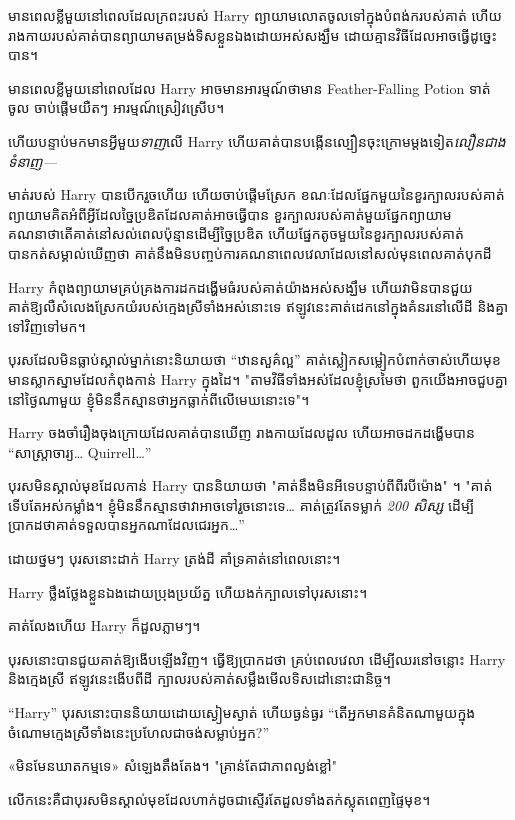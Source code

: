 មានពេលខ្លីមួយនៅពេលដែលក្រពះរបស់ Harry ព្យាយាមលោតចូលទៅក្នុងបំពង់ករបស់គាត់ ហើយរាងកាយរបស់គាត់បានព្យាយាមតម្រង់ទិសខ្លួនឯងដោយអស់សង្ឃឹម ដោយគ្មានវិធីដែលអាចធ្វើដូច្នេះបាន។

មានពេលខ្លីមួយនៅពេលដែល Harry អាចមានអារម្មណ៍ថាមាន Feather-Falling Potion ទាត់ចូល ចាប់ផ្តើមយឺតៗ អារម្មណ៍ស្រៀវស្រើប។

ហើយបន្ទាប់មកមានអ្វីមួយ\emph{ទាញ}លើ Harry ហើយគាត់បានបង្កើនល្បឿនចុះក្រោមម្តងទៀត\emph{លឿនជាងទំនាញ—}

មាត់របស់ Harry បានបើករួចហើយ ហើយចាប់ផ្តើមស្រែក ខណៈដែលផ្នែកមួយនៃខួរក្បាលរបស់គាត់ព្យាយាមគិតអំពីអ្វីដែលច្នៃប្រឌិតដែលគាត់អាចធ្វើបាន ខួរក្បាលរបស់គាត់មួយផ្នែកព្យាយាមគណនាថាតើគាត់នៅសល់ពេលប៉ុន្មានដើម្បីច្នៃប្រឌិត ហើយផ្នែកតូចមួយនៃខួរក្បាលរបស់គាត់បានកត់សម្គាល់ឃើញថា គាត់នឹងមិនបញ្ចប់ការគណនាពេលវេលាដែលនៅសល់មុនពេលគាត់បុកដី

\later

Harry កំពុងព្យាយាមគ្រប់គ្រងការដកដង្ហើមធំរបស់គាត់យ៉ាងអស់សង្ឃឹម ហើយវាមិនបានជួយគាត់ឱ្យលឺសំលេងស្រែកយំរបស់ក្មេងស្រីទាំងអស់នោះទេ ឥឡូវនេះគាត់ដេកនៅក្នុងគំនរនៅលើដី និងគ្នាទៅវិញទៅមក។

បុរស​ដែល​មិន​ធ្លាប់​ស្គាល់​ម្នាក់​នោះ​និយាយ​ថា “ឋានសួគ៌​ល្អ” គាត់​ស្លៀក​សម្លៀក​បំពាក់​ចាស់​ហើយ​មុខ​មាន​ស្លាកស្នាម​ដែល​កំពុង​កាន់ Harry ក្នុង​ដៃ។ "តាមវិធីទាំងអស់ដែលខ្ញុំស្រមៃថា ពួកយើងអាចជួបគ្នានៅថ្ងៃណាមួយ ខ្ញុំមិននឹកស្មានថាអ្នកធ្លាក់ពីលើមេឃនោះទេ"។

Harry ចងចាំរឿងចុងក្រោយដែលគាត់បានឃើញ រាងកាយដែលដួល ហើយអាចដកដង្ហើមបាន “សាស្រ្តាចារ្យ… Quirrell…”

បុរសមិនស្គាល់មុខដែលកាន់ Harry បាននិយាយថា "គាត់នឹងមិនអីទេបន្ទាប់ពីពីរបីម៉ោង" ។ "គាត់ទើបតែអស់កម្លាំង។ ខ្ញុំមិននឹកស្មានថាវាអាចទៅរួចនោះទេ… គាត់ត្រូវតែទម្លាក់ \emph{200 សិស្ស} ដើម្បីប្រាកដថាគាត់ទទួលបានអ្នកណាដែលជេរអ្នក…”

ដោយថ្នមៗ បុរសនោះដាក់ Harry ត្រង់ដី គាំទ្រគាត់នៅពេលនោះ។

Harry ថ្លឹងថ្លែងខ្លួនឯងដោយប្រុងប្រយ័ត្ន ហើយងក់ក្បាលទៅបុរសនោះ។

គាត់​លែង​ហើយ Harry ក៏​ដួល​ភ្លាម​ៗ។

បុរសនោះបានជួយគាត់ឱ្យងើបឡើងវិញ។ ធ្វើឱ្យប្រាកដថា គ្រប់ពេលវេលា ដើម្បីឈរនៅចន្លោះ Harry និងក្មេងស្រី ឥឡូវនេះងើបពីដី ក្បាលរបស់គាត់សម្លឹងមើលទិសដៅនោះជានិច្ច។

“Harry” បុរសនោះបាននិយាយដោយស្ងៀមស្ងាត់ ហើយធ្ងន់ធ្ងរ “តើអ្នកមានគំនិតណាមួយក្នុងចំណោមក្មេងស្រីទាំងនេះប្រហែលជាចង់សម្លាប់អ្នក?”

«មិនមែនឃាតកម្មទេ» សំឡេងតឹងតែង។ "គ្រាន់តែជាភាពល្ងង់ខ្លៅ"

លើក​នេះ​គឺ​ជា​បុរស​មិន​ស្គាល់​មុខ​ដែល​ហាក់​ដូច​ជា​ស្ទើរ​តែ​ដួល​ទាំង​តក់​ស្លុត​ពេញ​ផ្ទៃ​មុខ។

